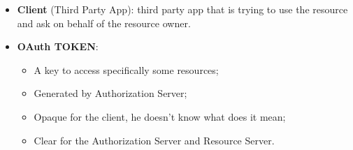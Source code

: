 \documentclass[9pt, letterpaper]{article}
\begin{document}
\begin{itemize}
\begin{itemize}
		      \item \textbf{Client} (Third Party App): third party app that is trying to use the resource and ask on behalf of the resource owner.
		      \item \textbf{OAuth TOKEN}:
		            \begin{itemize}
			            \item A key to access specifically some resources;
			            \item Generated by Authorization Server;
			            \item Opaque for the client, he doesn't know what does it mean;
			            \item Clear for the Authorization Server and Resource Server.
		            \end{itemize}
	      \end{itemize}
\end{itemize}

\newpage
\end{document}
